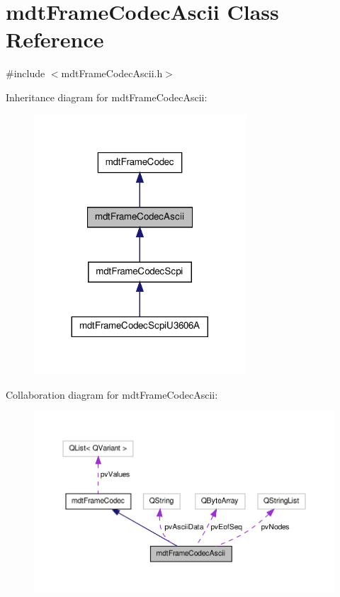 \hypertarget{classmdt_frame_codec_ascii}{\section{mdt\-Frame\-Codec\-Ascii Class Reference}
\label{classmdt_frame_codec_ascii}
}


{\ttfamily \#include $<$mdt\-Frame\-Codec\-Ascii.\-h$>$}



Inheritance diagram for mdt\-Frame\-Codec\-Ascii\-:
\nopagebreak
\begin{figure}[H]
\begin{center}
\leavevmode
\includegraphics[width=224pt]{classmdt_frame_codec_ascii__inherit__graph}
\end{center}
\end{figure}


Collaboration diagram for mdt\-Frame\-Codec\-Ascii\-:
\nopagebreak
\begin{figure}[H]
\begin{center}
\leavevmode
\includegraphics[width=350pt]{classmdt_frame_codec_ascii__coll__graph}
\end{center}
\end{figure}
